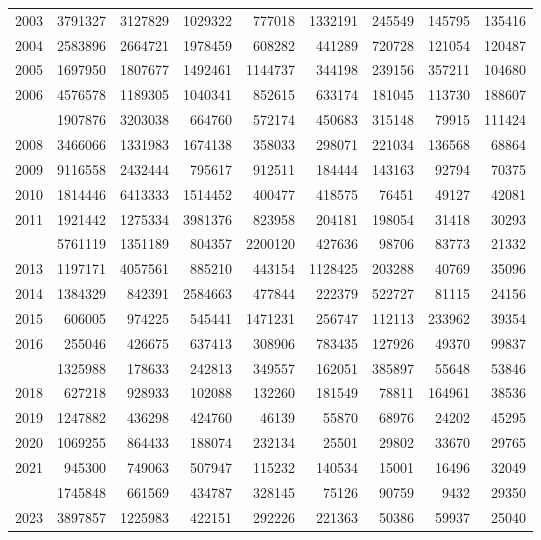 \documentclass[
]{article}
\begin{document}
\begin{longtable}[t]{lrrrrrrrr}
2003 & 3791327 & 3127829 & 1029322 & 777018 & 1332191 & 245549 & 145795 & 135416\\
2004 & 2583896 & 2664721 & 1978459 & 608282 & 441289 & 720728 & 121054 & 120487\\
2005 & 1697950 & 1807677 & 1492461 & 1144737 & 344198 & 239156 & 357211 & 104680\\
2006 & 4576578 & 1189305 & 1040341 & 852615 & 633174 & 181045 & 113730 & 188607\\
\addlinespace
2007 & 1907876 & 3203038 & 664760 & 572174 & 450683 & 315148 & 79915 & 111424\\
2008 & 3466066 & 1331983 & 1674138 & 358033 & 298071 & 221034 & 136568 & 68864\\
2009 & 9116558 & 2432444 & 795617 & 912511 & 184444 & 143163 & 92794 & 70375\\
2010 & 1814446 & 6413333 & 1514452 & 400477 & 418575 & 76451 & 49127 & 42081\\
2011 & 1921442 & 1275334 & 3981376 & 823958 & 204181 & 198054 & 31418 & 30293\\
\addlinespace
2012 & 5761119 & 1351189 & 804357 & 2200120 & 427636 & 98706 & 83773 & 21332\\
2013 & 1197171 & 4057561 & 885210 & 443154 & 1128425 & 203288 & 40769 & 35096\\
2014 & 1384329 & 842391 & 2584663 & 477844 & 222379 & 522727 & 81115 & 24156\\
2015 & 606005 & 974225 & 545441 & 1471231 & 256747 & 112113 & 233962 & 39354\\
2016 & 255046 & 426675 & 637413 & 308906 & 783435 & 127926 & 49370 & 99837\\
\addlinespace
2017 & 1325988 & 178633 & 242813 & 349557 & 162051 & 385897 & 55648 & 53846\\
2018 & 627218 & 928933 & 102088 & 132260 & 181549 & 78811 & 164961 & 38536\\
2019 & 1247882 & 436298 & 424760 & 46139 & 55870 & 68976 & 24202 & 45295\\
2020 & 1069255 & 864433 & 188074 & 232134 & 25501 & 29802 & 33670 & 29765\\
2021 & 945300 & 749063 & 507947 & 115232 & 140534 & 15001 & 16496 & 32049\\
\addlinespace
2022 & 1745848 & 661569 & 434787 & 328145 & 75126 & 90759 & 9432 & 29350\\
2023 & 3897857 & 1225983 & 422151 & 292226 & 221363 & 50386 & 59937 & 25040\\*
\end{longtable}
\end{document}
